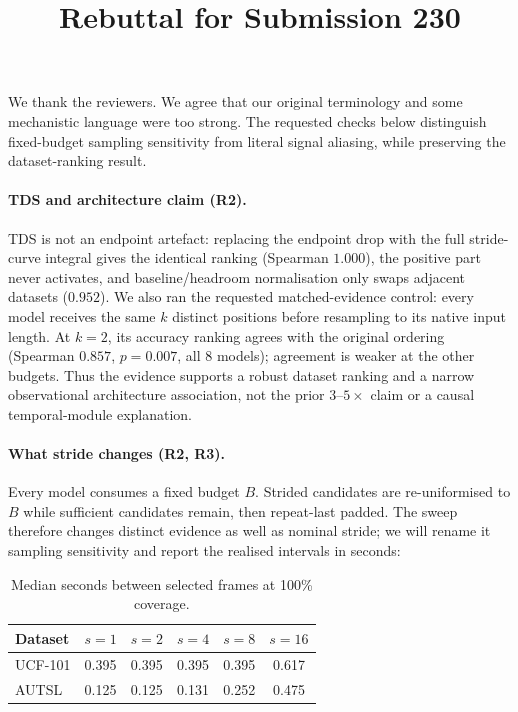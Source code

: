 \documentclass[10pt,twocolumn,letterpaper]{article}
\begin{document}
\title{Rebuttal for Submission 230}

\maketitle
\thispagestyle{empty}
\appendix

We thank the reviewers. We agree that our original terminology and some
mechanistic language were too strong. The requested checks below distinguish
fixed-budget sampling sensitivity from literal signal aliasing, while preserving
the dataset-ranking result.

\paragraph{TDS and architecture claim (R2).}
\textsc{TDS} is not an endpoint artefact: replacing the endpoint drop with the
full stride-curve integral gives the identical ranking (Spearman $1.000$), the
positive part never activates, and baseline/headroom normalisation only swaps
adjacent datasets ($0.952$). We also ran the requested matched-evidence control:
every model receives the same $k$ distinct positions before resampling to its
native input length. At $k=2$, its accuracy ranking agrees with the original
ordering (Spearman $0.857$, $p{=}0.007$, all 8 models); agreement is weaker at
the other budgets. Thus the evidence supports a robust dataset ranking and a
narrow observational architecture association, not the prior $3$--$5\times$
claim or a causal temporal-module explanation.

\paragraph{What stride changes (R2, R3).}
Every model consumes a fixed budget $B$. Strided candidates are re-uniformised
to $B$ while sufficient candidates remain, then repeat-last padded. The sweep
therefore changes distinct evidence as well as nominal stride; we will rename it
sampling sensitivity and report the realised intervals in seconds:

\begin{table}[t]
\centering\footnotesize
\setlength{\tabcolsep}{4pt}
\begin{tabular}{lccccc}
\toprule
Dataset & $s{=}1$ & $s{=}2$ & $s{=}4$ & $s{=}8$ & $s{=}16$ \\
\midrule
UCF-101 & 0.395 & 0.395 & 0.395 & 0.395 & 0.617 \\
AUTSL   & 0.125 & 0.125 & 0.131 & 0.252 & 0.475 \\
\bottomrule
\end{tabular}
\caption{Median seconds between selected frames at 100\% coverage.}
\label{tab:seconds}
\end{table}
\end{document}
